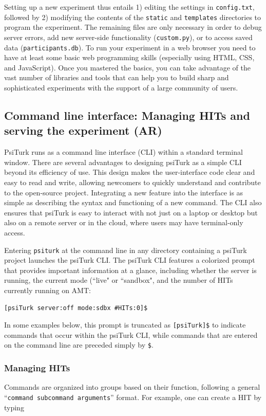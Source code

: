 \documentclass[twocolumn]{svjour3}          %
\begin{document}
Setting up a new experiment thus entails 1) editing the settings in \texttt{config.txt}, followed by 2) modifying the contents of the \texttt{static} and \texttt{templates} directories to program the experiment.
The remaining files are only necessary in order to debug server errors, add new server-side functionality (\texttt{custom.py}), or to access saved data (\texttt{participants.db}).
To run your experiment in a web browser you need to have at least some basic web programming skills (especially using HTML, CSS, and JavaScript).
Once you mastered the basics, you can take advantage of the vast number of libraries and tools that can help you to build sharp and sophisticated experiments with the support of a large community of users.


\subsection{Command line interface: Managing HITs and serving the experiment (AR)}

PsiTurk runs as a command line interface (CLI) within a standard terminal window.
There are several advantages to designing psiTurk as a simple CLI beyond its efficiency of use. This
design makes the user-interface code clear and easy to read and write, allowing newcomers to quickly
understand and contribute to the open-source project. Integrating a new feature into the interface
is as simple as describing the syntax and functioning of a new command. The CLI also ensures that
psiTurk is easy to interact with not just on a laptop or desktop but also on a remote server or in
the cloud, where users may have terminal-only access.
 
Entering
\texttt{psiturk} at the command line in any directory containing a psiTurk project launches the
psiTurk CLI.
The psiTurk CLI features a colorized prompt that provides important information at a glance, including
whether the server is running, the current mode (``live" or ``sandbox", and the number of HITs currently running on AMT:

\begin{lstlisting}
[psiTurk server:off mode:sdbx #HITs:0]$
\end{lstlisting}

\noindent In some examples below, this prompt is truncated as \texttt{[psiTurk]\$} to indicate commands that occur within the psiTurk CLI, while commands that are entered on the command line are preceded simply by \texttt{\$}.


\subsubsection{Managing HITs}
Commands are organized into groups based on their function, following a general ``\texttt{command subcommand
arguments}'' format. For example, one can create a HIT by typing 
\end{document}
